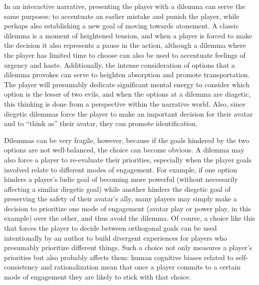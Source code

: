 In an interactive narrative, presenting the player with a dilemma can serve the same purposes: to accentuate an earlier mistake and punish the player, while perhaps also establishing a new goal of moving towards atonement.
%
A classic dilemma is a moment of heightened tension, and when a player is forced to make the decision it also represents a pause in the action, although a dilemma where the player has limited time to choose can also be used to accentuate feelings of urgency and haste.
%
Additionally, the intense consideration of options that a dilemma provokes can serve to heighten absorption and promote transportation.
%
The player will presumably dedicate significant mental energy to consider which option is the lesser of two evils, and when the options at a dilemma are diagetic, this thinking is done from a perspective within the narrative world.
%
Also, since diegetic dilemmas force the player to make an important decision for their avatar and to ``think as'' their avatar, they can promote identification.


Dilemmas can be very fragile, however, because if the goals hindered by the two options are not well-balanced, the choice can become obvious.
%
A dilemma may also force a player to re-evaluate their priorities, especially when the player goals involved relate to different modes of engagement.
%
For example, if one option hinders a player's ludic goal of becoming more powerful (without necessarily affecting a similar diegetic goal) while another hinders the diegetic goal of preserving the safety of their avatar's ally, many players may simply make a decision to prioritize one mode of engagement (avatar play or power play, in this example) over the other, and thus avoid the dilemma.
%
Of course, a choice like this that forces the player to decide between orthogonal goals can be used intentionally by an author to build divergent experiences for players who presumably prioritize different things.
%
Such a choice not only measures a player's priorities but also probably affects them: human cognitive biases related to self-consistency and rationalization mean that once a player commits to a certain mode of engagement they are likely to stick with that choice. 


